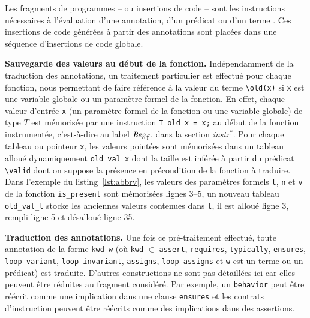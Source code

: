 Les fragments de programmes -- ou insertions de code -- sont les instructions
nécessaires à l'évaluation d'une annotation, d'un prédicat ou d'un terme
\eacsl.
Ces insertions de code générées à partir des annotations sont placées
dans une séquence d'insertions de code globale.

\textbf{Sauvegarde des valeurs  au début de la fonction.}
Indépendamment de la traduction des annotations, un traitement particulier est
effectué pour chaque fonction, nous permettant de faire référence à la valeur
du terme \lstinline'\old(x)' si \lstinline'x' est une variable globale ou un
paramètre formel de la fonction.
En effet, chaque valeur d'entrée \lstinline'x' (un paramètre formel de la
fonction ou une variable globale) de type $T$ est mémorisée par
une instruction \lstinline'T old_x = x;' au début de la fonction
instrumentée, c'est-à-dire au label $Beg_{\mbox{\lstinline'f'}}$, dans la section
\textit{instr}$^{*}$.
Pour chaque tableau ou pointeur \lstinline'x', les valeurs pointées sont
mémorisées dans un tableau alloué dynamiquement \lstinline'old_val_x' dont la
taille est inférée à partir du prédicat \lstinline'\valid' dont on suppose la
présence en précondition de la fonction à traduire.
Dans l'exemple du listing~\ref{lst:abbrv}, les valeurs des paramètres formels
\lstinline't', \lstinline'n' et \lstinline'v' de la fonction
\lstinline'is_present' sont mémorisées lignes 3--5, un
nouveau tableau \lstinline'old_val_t' stocke les anciennes valeurs contenues
dans \lstinline't', il est alloué ligne 3, rempli ligne 5 et désalloué ligne 35.

\textbf{Traduction des annotations.}
Une fois ce pré-traitement effectué, toute annotation \eacsl de la forme
\lstinline'kwd w' (où \lstinline'kwd' $\in$ \bopen \lstinline'assert',
\lstinline'requires', \lstinline'typically', \lstinline'ensures',
\lstinline'loop variant', \lstinline'loop invariant', \lstinline'assigns',
\lstinline'loop assigns' \bclose et \lstinline'w' est un terme ou un prédicat)
est traduite.
D'autres constructions \eacsl ne sont pas détaillées ici car elles peuvent être
réduites au fragment \eacsl considéré.
Par exemple, un \lstinline'behavior' peut être réécrit comme une implication
dans une clause \lstinline'ensures' et les contrats d'instruction peuvent être
réécrits comme des implications dans des assertions.





